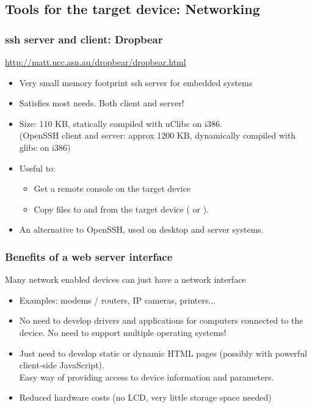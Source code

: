 \subsection[Networking tools]{Tools for the target device: Networking}

\begin{frame}
  \frametitle{ssh server and client: Dropbear}
  \url{http://matt.ucc.asn.au/dropbear/dropbear.html}
  \begin{itemize}
  \item Very small memory footprint ssh server for embedded systems
  \item Satisfies most needs. Both client and server!
  \item Size: 110 KB, statically compiled with uClibc on i386.\\
    (OpenSSH client and server: approx 1200 KB, dynamically compiled
    with glibc on i386)
  \item Useful to:
    \begin{itemize}
    \item Get a remote console on the target device
    \item Copy files to and from the target device ( or
      ).
    \end{itemize}
  \item An alternative to OpenSSH, used on desktop and server systems.
  \end{itemize}
\end{frame}

\begin{frame}
  \frametitle{Benefits of a web server interface}

  Many network enabled devices can just have a network interface

  \begin{itemize}
  \item Examples: modems / routers, IP cameras, printers...
  \item No need to develop drivers and applications for computers
    connected to the device. No need to support multiple operating
    systems!
  \item Just need to develop static or dynamic HTML pages (possibly
    with powerful client-side JavaScript).\\
    Easy way of providing access to device information and parameters.
  \item Reduced hardware costs (no LCD, very little storage space
    needed)
  \end{itemize}
\end{frame}

